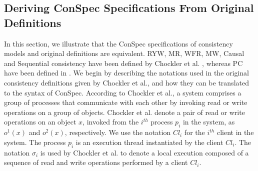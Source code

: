 \documentclass[journal,compsoc]{IEEEtran}
\begin{document}
 \subsection{Deriving ConSpec Specifications From Original Definitions}\label{sec:derive}
  In this section, %
  we illustrate that %
  the ConSpec specifications of  consistency models  and original definitions \cite{Chockler2000, Ahamad:1993:PPC:165231.165264, Owens:2009:BXM:1616077.1616107} are equivalent.  RYW, MR, WFR, MW, Causal and Sequential consistency have been defined by Chockler et al. \cite{Chockler2000}, whereas PC have been defined in \cite{Ahamad:1993:PPC:165231.165264, Owens:2009:BXM:1616077.1616107}. 
   We begin by describing the  notations used in the original consistency definitions given by Chockler et al., and how they can be translated to %
  the syntax of ConSpec.  According to Chockler et al., a system comprises a group of processes that communicate with each other by invoking read or write operations on a group of objects. 
  Chockler et al. denote   a pair of  read or write operations on an object $x$, invoked from %
 the $i^{th}$  process $ p_i$ in the system, as $\mathit{o}^1(x)$ and
 $\mathit{o}^2(x)$, respectively. %
We use the notation $\mathit{Cl}_i$ for the $i^{th}$ client in the system. The process $ p_i$ is an execution thread instantiated by the client $\mathit{Cl}_i$. %
  The
  notation $\sigma_i$ is used by Chockler et al. to denote a local execution composed of a sequence of read and write operations  performed by  a client $\mathit{Cl}_i$. %
\end{document}
